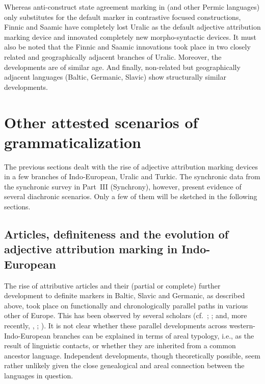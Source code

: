 {Whereas anti\hyp{}construct state agreement marking in  (and other Permic languages) only substitutes for the default marker in contrastive focused constructions, Finnic and Saamic have completely lost Uralic  as the default adjective attribution marking device and innovated completely new morpho-syntactic devices. It must also be noted that the Finnic and Saamic innovations took place in two closely related and geographically adjacent branches of Uralic. Moreover, the developments are of similar age. And finally, non-related but geographically adjacent languages (Baltic, Germanic, Slavic) show structurally similar developments.

\section{Other attested scenarios of grammaticalization}
The previous sections dealt with the rise of adjective attribution marking devices in a few branches of Indo-European, Uralic and Turkic. The synchronic data from the synchronic survey in Part~III (Synchrony), however, present evidence of several diachronic scenarios. Only a few of them will be sketched in the following sections.

\subsection[Articles, definiteness and adjective attribution]{Articles, definiteness and the evolution of adjective attribution marking in Indo-European}
The rise of attributive articles and their (partial or complete) further development to definite markers in Baltic, Slavic and Germanic, as described above, took place on functionally and chronologically parallel paths in various other  of Europe. This has been observed by several scholars (cf.~\citealt{brugmann-etal1916}; \citealt{gamillscheg1937}; \citealt{heinrichs1954} and, more recently, \citealt{nocentini1996}, \citealt{philippi1997}; \citealt{himmelmann1997}). It is not clear whether these parallel developments across western-Indo-European branches can be explained in terms of areal typology, i.e., as the result of linguistic contacts, or whether they are inherited from a common ancestor language. Independent developments, though theoretically possible, seem rather unlikely given the close genealogical and areal connection between the languages in question.

}
